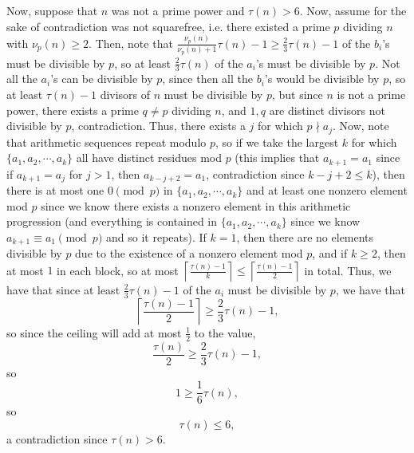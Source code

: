 \documentclass[a4paper]{article}
\begin{document}
\begin{question}[c]{}
{Now, suppose that $n$ was not a prime power and $\tau(n) > 6$. Now, assume for the sake of contradiction was not squarefree, i.e. there existed a prime $p$ dividing $n$ with $\nu_p(n) \geq 2$. Then, note that $\frac{\nu_p(n)}{\nu_p(n)+1}\tau(n)-1 \geq \frac{2}{3}\tau(n)-1$ of the $b_i$'s must be divisible by $p$, so at least $\frac{2}{3}\tau(n)$ of the $a_i$'s must be divisible by $p$. Not all the $a_i$'s can be divisible by $p$, since then all the $b_i$'s would be divisible by $p$, so at least $\tau(n)-1$ divisors of $n$ must be divisible by $p$, but since $n$ is not a prime power, there exists a prime $q\neq p$ dividing $n$, and $1, q$ are distinct divisors not divisible by $p$, contradiction. Thus, there exists a $j$ for which $p\nmid a_j$. Now, note that arithmetic sequences repeat modulo $p$, so if we take the largest $k$ for which $\{a_1, a_2, \cdots, a_k\}$ all have distinct residues mod $p$ (this implies that $a_{k+1} = a_1$ since if $a_{k+1} = a_j$ for $j > 1$, then $a_{k-j+2} = a_1$, contradiction since $k-j+2\leq k$), then there is at most one $0\pmod{p}$ in $\{a_1, a_2, \cdots, a_k\}$ and at least one nonzero element mod $p$ since we know there exists a nonzero element in this arithmetic progression (and everything is contained in $\{a_1, a_2, \cdots, a_k\}$ since we know $a_{k+1} \equiv a_1\pmod{p}$ and so it repeats). If $k = 1$, then there are no elements divisible by $p$ due to the existence of a nonzero element mod $p$, and if $k\geq 2$, then at most $1$ in each block, so at most $\left \lceil \frac{\tau(n)-1}{k}\right \rceil \leq \left \lceil \frac{\tau(n)-1}{2}\right \rceil$ in total. Thus, we have that since at least $\frac{2}{3}\tau(n)-1$ of the $a_i$ must be divisible by $p$, we have that $$\left \lceil \frac{\tau(n)-1}{2}\right \rceil \geq \frac{2}{3}\tau(n) - 1,$$so since the ceiling will add at most $\frac{1}{2}$ to the value, $$\frac{\tau(n)}{2} \geq \frac{2}{3}\tau(n) - 1,$$so $$1 \geq \frac{1}{6}\tau(n),$$so $$\tau(n) \leq 6,$$a contradiction since $\tau(n) > 6$.

}
\end{question}
\end{document}
